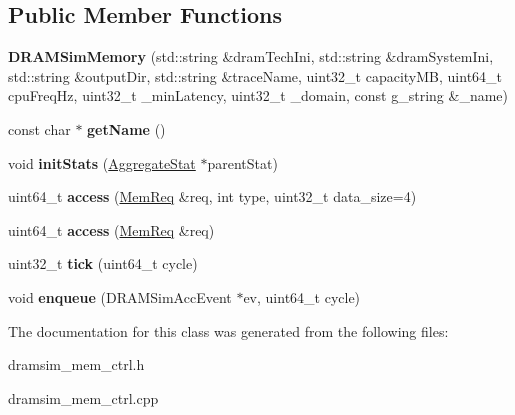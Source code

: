 \subsection*{Public Member Functions}
\begin{DoxyCompactItemize}
\item 
\hypertarget{classDRAMSimMemory_a62c51e3bd12940fd4ab74a8d5b8de1ed}{{\bfseries D\-R\-A\-M\-Sim\-Memory} (std\-::string \&dram\-Tech\-Ini, std\-::string \&dram\-System\-Ini, std\-::string \&output\-Dir, std\-::string \&trace\-Name, uint32\-\_\-t capacity\-M\-B, uint64\-\_\-t cpu\-Freq\-Hz, uint32\-\_\-t \-\_\-min\-Latency, uint32\-\_\-t \-\_\-domain, const g\-\_\-string \&\-\_\-name)}\label{classDRAMSimMemory_a62c51e3bd12940fd4ab74a8d5b8de1ed}

\item 
\hypertarget{classDRAMSimMemory_a712837b00ca1ff452c6b314d0eac70ec}{const char $\ast$ {\bfseries get\-Name} ()}\label{classDRAMSimMemory_a712837b00ca1ff452c6b314d0eac70ec}

\item 
\hypertarget{classDRAMSimMemory_a270e07a2c22746179abb8d1e0ae442f6}{void {\bfseries init\-Stats} (\hyperlink{classAggregateStat}{Aggregate\-Stat} $\ast$parent\-Stat)}\label{classDRAMSimMemory_a270e07a2c22746179abb8d1e0ae442f6}

\item 
\hypertarget{classDRAMSimMemory_a0360046055a613f6fcf21abe76d68ac6}{uint64\-\_\-t {\bfseries access} (\hyperlink{structMemReq}{Mem\-Req} \&req, int type, uint32\-\_\-t data\-\_\-size=4)}\label{classDRAMSimMemory_a0360046055a613f6fcf21abe76d68ac6}

\item 
\hypertarget{classDRAMSimMemory_aec4b3a71bfa1e021e34d6091c31ffb97}{uint64\-\_\-t {\bfseries access} (\hyperlink{structMemReq}{Mem\-Req} \&req)}\label{classDRAMSimMemory_aec4b3a71bfa1e021e34d6091c31ffb97}

\item 
\hypertarget{classDRAMSimMemory_ae3e9517bb81acd6cc17961f210490db5}{uint32\-\_\-t {\bfseries tick} (uint64\-\_\-t cycle)}\label{classDRAMSimMemory_ae3e9517bb81acd6cc17961f210490db5}

\item 
\hypertarget{classDRAMSimMemory_a71ba63111322818f232cd1efc04a5aff}{void {\bfseries enqueue} (D\-R\-A\-M\-Sim\-Acc\-Event $\ast$ev, uint64\-\_\-t cycle)}\label{classDRAMSimMemory_a71ba63111322818f232cd1efc04a5aff}

\end{DoxyCompactItemize}


The documentation for this class was generated from the following files\-:\begin{DoxyCompactItemize}
\item 
dramsim\-\_\-mem\-\_\-ctrl.\-h\item 
dramsim\-\_\-mem\-\_\-ctrl.\-cpp\end{DoxyCompactItemize}
